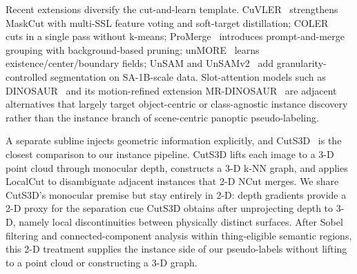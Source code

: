 \documentclass{article}
\begin{document}
Recent extensions diversify the cut-and-learn template. CuVLER~\cite{arica2024cuvler} strengthens MaskCut with multi-SSL feature voting and soft-target distillation; COLER~\cite{feng2025coler} cuts in a single pass without k-means; ProMerge~\cite{li2024promerge} introduces prompt-and-merge grouping with background-based pruning; unMORE~\cite{yang2025unmore} learns existence/center/boundary fields; UnSAM and UnSAMv2~\cite{wang2024unsam,yu2025unsamv2} add granularity-controlled segmentation on SA-1B-scale data. Slot-attention models such as DINOSAUR~\cite{seitzer2023dinosaur} and its motion-refined extension MR-DINOSAUR~\cite{gong2025mrdinosaur} are adjacent alternatives that largely target object-centric or class-agnostic instance discovery rather than the instance branch of scene-centric panoptic pseudo-labeling.

A separate subline injects geometric information explicitly, and CutS3D~\cite{sick2025cuts3d} is the closest comparison to our instance pipeline. CutS3D lifts each image to a 3-D point cloud through monocular depth, constructs a 3-D k-NN graph, and applies LocalCut to disambiguate adjacent instances that 2-D NCut merges. We share CutS3D's monocular premise but stay entirely in 2-D: depth gradients provide a 2-D proxy for the separation cue CutS3D obtains after unprojecting depth to 3-D, namely local discontinuities between physically distinct surfaces. After Sobel filtering and connected-component analysis within thing-eligible semantic regions, this 2-D treatment supplies the instance side of our pseudo-labels without lifting to a point cloud or constructing a 3-D graph.
\end{document}
